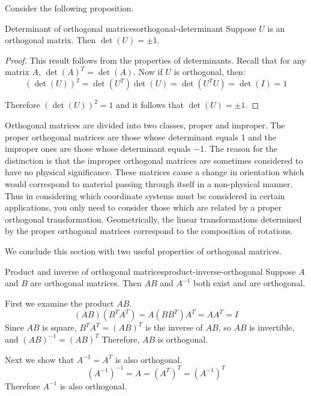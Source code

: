 Consider the following proposition.

\begin{proposition}{Determinant of orthogonal matrices}{orthogonal-determinant}
Suppose $U$ is an orthogonal matrix. Then $\det (U) = \pm 1$.
\end{proposition}

\begin{proof}
This result follows from the properties of determinants. Recall that
for any matrix $A$, $\det(A)^T = \det(A)$. Now if $U$ is orthogonal, then:
\begin{equation*}
(\det (U)) ^{2}=\det (U^{T}) \det (U)
=\det (U^{T}U) =\det (I) =1
\end{equation*}

Therefore $(\det (U))^2 = 1$ and it follows that $\det (U) = \pm 1$.
\end{proof}

Orthogonal matrices are divided into two classes, proper and improper.
The proper orthogonal matrices are those whose determinant equals 1
and the improper ones are those whose determinant equals $-1$. The
reason for the distinction is that the improper orthogonal matrices
are sometimes considered to have no physical significance. These
matrices cause a change in orientation which would correspond to
material passing through itself in a non-physical manner. Thus in
considering which coordinate systems must be considered in certain
applications, you only need to consider those which are related by a
proper orthogonal transformation. Geometrically, the linear
transformations determined by the proper orthogonal matrices
correspond to the composition of rotations.

We conclude this section with two useful properties of orthogonal matrices.

\begin{example}{Product and inverse of orthogonal matrices}{product-inverse-orthogonal}
Suppose $A$ and $B$ are orthogonal matrices. Then $AB$ and $A^{-1}$ both exist and are orthogonal.
\end{example}

\begin{solution}
First we examine the product $AB$.
\[ (AB)(B^TA^T)=A(BB^T)A^T =AA^T=I \]
Since $AB$ is square, $B^TA^T=(AB)^T$ is the inverse of
$AB$, so $AB$ is invertible, and $(AB)^{-1}=(AB)^T$
Therefore, $AB$ is orthogonal.

Next we show that $A^{-1}=A^T$ is also orthogonal.
\[ (A^{-1})^{-1} = A = (A^T)^{T}
=(A^{-1})^{T} \]
Therefore $A^{-1}$ is also orthogonal.
\end{solution}
